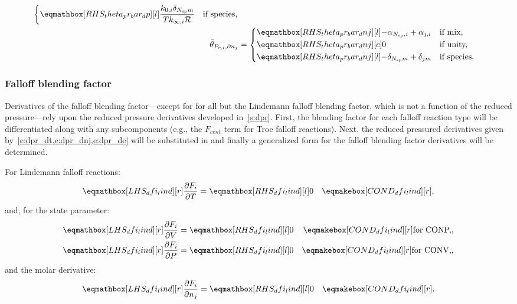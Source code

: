 \documentclass[12pt,number,sort&compress]{elsarticle}
\begin{document}
\begin{align}
\begin{dcases}
  \rhs{theta_pr_bar_dp}{\frac{k_{0, i} \delta_{\ns/ m}}{T k_{\infty, i} \Ru/}} & \text{if species,}
 \end{dcases} \\
 \label{e:dpr_theta_bar_dnj}
 \bar{\theta}_{P_{r, i}, \partial n_j} &=
 \begin{dcases}
  \rhs{theta_pr_bar_dnj}{- \alpha_{\ns/,i} + \alpha_{j,i}} & \text{if mix,} \\
  \rhs{theta_pr_bar_dnj}{0}[c] & \text{if unity,}  \\
  \rhs{theta_pr_bar_dnj}{- \delta_{\ns/ m} + \delta_{j m}} & \text{if species.}
 \end{dcases}
\end{align}


\subsubsection{Falloff blending factor}
\label{s:dfi}

Derivatives of the falloff blending factor---except for for all but the Lindemann falloff blending factor, which is not a function of the reduced pressure---rely upon the reduced pressure derivatives developed in~\cref{s:dpr}.
First, the blending factor for each falloff reaction type will be differentiated along with any subcomponents (e.g., the $F_{cent}$ term for Troe falloff reactions).
Next, the reduced pressured derivatives given by~\cref{e:dpr_dt,e:dpr_dnj,e:dpr_de} will be substituted in and finally a generalized form for the falloff blending factor derivatives will be determined.

For Lindemann falloff reactions:
\begin{align}
 \lhs{dfi_lind}{\frac{\partial F_{i} }{\partial T }} &= \rhs{dfi_lind}{0} & \cond{dfi_lind}{,} \label{e:dfi_lind_dt} \\
\end{align}
and, for the state parameter:
\begin{subequations}
 \label{e:dfi_lind_de}
 \begin{align}
  \lhs{dfi_lind}{\frac{\partial F_{i} }{\partial V }} &= \rhs{dfi_lind}{0} & \cond{dfi_lind}{\dconp/,} \\
  \lhs{dfi_lind}{\frac{\partial F_{i} }{\partial P }} &= \rhs{dfi_lind}{0} & \cond{dfi_lind}{\dconv/,}
 \end{align}
\end{subequations}
and the molar derivative:
\begin{align}
 \lhs{dfi_lind}{\frac{\partial F_{i} }{\partial n_j }} &= \rhs{dfi_lind}{0} & \cond{dfi_lind}{.} \label{e:dfi_lind_dnj}
\end{align}
\end{document}
